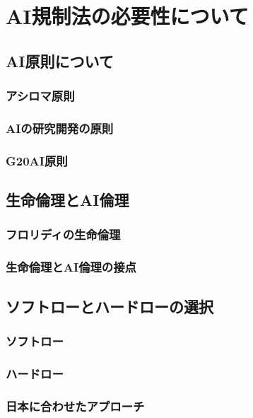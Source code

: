 \chapter{AI規制法の必要性について}

\section{AI原則について}

\subsection{アシロマ原則}

\subsection{AIの研究開発の原則}

\subsection{G20AI原則}

\section{生命倫理とAI倫理}

\subsection{フロリディの生命倫理}

\subsection{生命倫理とAI倫理の接点}

\section{ソフトローとハードローの選択}

\subsection{ソフトロー}

\subsection{ハードロー}

\subsection{日本に合わせたアプローチ}